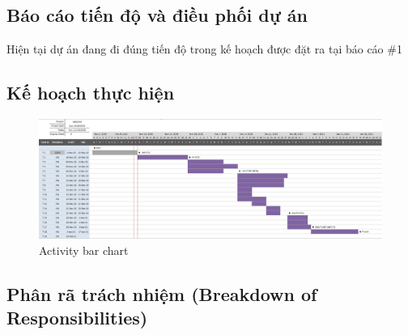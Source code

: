 \documentclass[a4paper, 12pt]{article}
\begin{document}
\subsection{Báo cáo tiến độ và điều phối dự án}

Hiện tại dự án đang đi đúng tiến độ trong kế hoạch được đặt ra tại báo cáo \#1

\subsection{Kế hoạch thực hiện}

\begin{figure}[H]
	\begin{center}
		\includegraphics[scale=0.35, angle=90]{image/gantt.png}
		\caption{Activity bar chart}
	\end{center}
\end{figure}

\subsection{Phân rã trách nhiệm (Breakdown of Responsibilities)}
\end{document}
